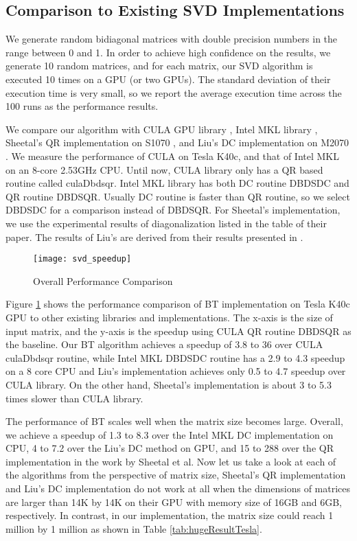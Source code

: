 \subsection{Comparison to Existing SVD Implementations}
We generate random bidiagonal matrices with double precision numbers in the range between 0 and 1.
In order to achieve high confidence on the results, we generate 10
random matrices, and
for each matrix, our SVD algorithm is executed 10 times on a GPU (or two GPUs).
The standard deviation of their execution time is very small, so we report
the average execution time across the 100 runs as the performance results.

We compare our algorithm with CULA GPU library \cite{cula}, Intel MKL
library \cite{mkl}, Sheetal's QR implementation on S1070 \cite{09IPDPSQR},
and Liu's DC implementation on M2070 \cite{13CFDC}.
We measure the performance of CULA on Tesla K40c, and that of Intel
MKL on an 8-core 2.53GHz CPU.
Until now, CULA library only has a QR based routine called culaDbdsqr.
Intel MKL library has both DC routine DBDSDC and QR routine DBDSQR.
Usually DC routine is faster than QR routine, so we select DBDSDC for a comparison instead of DBDSQR.
For Sheetal's implementation, we use the experimental results of diagonalization listed in the table of their paper.
The results of Liu's are derived from their results presented in \cite{13CFDC}.

\begin{figure}[hbpt]
\centering
\texttt{[image: svd\_speedup]}
\caption{Overall Performance Comparison}
\label{fig:svd_speedup}
\vspace{-0.1in}
\end{figure}
Figure \ref{fig:svd_speedup} shows the performance comparison of BT
implementation on Tesla K40c GPU to other existing libraries
and implementations.
The x-axis is the size of input matrix, and the y-axis is the speedup
using CULA QR routine DBDSQR as the baseline.
Our BT algorithm achieves a speedup of 3.8 to 36 over CULA culaDbdsqr routine,
while Intel MKL DBDSDC routine has a 2.9 to 4.3 speedup on a 8 core CPU and Liu's implementation achieves only 0.5 to 4.7 speedup over CULA library.
On the other hand, Sheetal's implementation is about 3 to 5.3 times slower than CULA library.

The performance of BT scales well when the matrix size becomes large.
Overall, we achieve a speedup of 1.3 to 8.3 over the Intel MKL
DC implementation on CPU, 4 to 7.2 over the Liu's
DC method on GPU, and 15 to 288 over the QR implementation in the work by Sheetal et al.
Now let us take a look at each of the algorithms from the perspective of matrix size, Sheetal's QR implementation and Liu's DC implementation do not work at all when the dimensions of matrices are larger than 14K by 14K on their GPU with memory size of 16GB and 6GB, respectively. In contrast, in our implementation, the matrix size could reach 1 million by 1 million as shown in Table \ref{tab:hugeResultTesla}.

